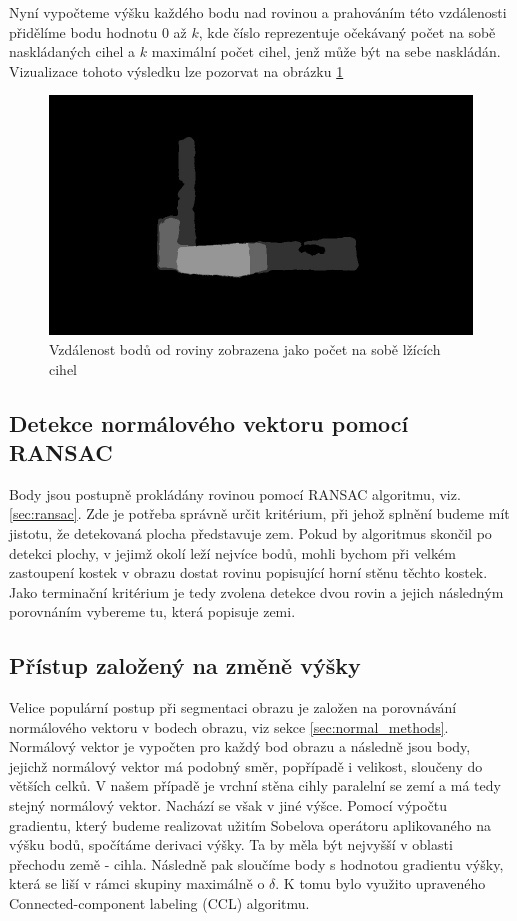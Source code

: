 \documentclass[twoside]{ctuthesis}
\begin{document}
Nyní vypočteme výšku každého bodu nad rovinou a prahováním této vzdálenosti přidělíme bodu hodnotu 0 až $k$, kde číslo reprezentuje očekávaný počet na sobě naskládaných cihel a $k$ maximální počet cihel, jenž může být na sebe naskládán. Vizualizace tohoto výsledku lze pozorvat na obrázku \ref{fig:height_map}

\begin{figure}
    \centering
    \includegraphics[width = \linewidth]{pictures/original_vrstva2_pic1.jpg}
    \caption{Vzdálenost bodů od roviny zobrazena jako počet na sobě lžících cihel}
    \label{fig:height_map}
\end{figure}

\subsection{Detekce normálového vektoru pomocí RANSAC}
\label{sec:plane_ransac}
Body jsou postupně prokládány rovinou pomocí RANSAC algoritmu, viz. \ref{sec:ransac}. Zde je potřeba správně určit kritérium, při jehož splnění budeme mít jistotu, že detekovaná plocha představuje zem. Pokud by algoritmus skončil po detekci plochy, v jejimž okolí leží nejvíce bodů, mohli bychom při velkém zastoupení kostek v obrazu dostat rovinu popisující horní stěnu těchto kostek. Jako terminační kritérium je tedy zvolena detekce dvou rovin a jejich následným porovnáním vybereme tu, která popisuje zemi.

\subsection{Přístup založený na změně výšky}
\label{sec:sobel_normal}
Velice populární postup při segmentaci obrazu je založen na porovnávání normálového vektoru v bodech obrazu, viz sekce \ref{sec:normal_methods}. Normálový vektor je vypočten pro každý bod obrazu a následně jsou body, jejichž normálový vektor má podobný směr, popřípadě i velikost, sloučeny do větších celků. V našem případě je vrchní stěna cihly paralelní se zemí a má tedy stejný normálový vektor. Nachází se však v jiné výšce. Pomocí výpočtu gradientu, který budeme realizovat užitím Sobelova operátoru aplikovaného na výšku bodů, spočítáme derivaci výšky. Ta by měla být nejvyšší v oblasti přechodu země - cihla. Následně pak sloučíme body s hodnotou gradientu výšky, která se liší v rámci skupiny maximálně o $\delta$. K tomu bylo využito upraveného Connected-component labeling (CCL) algoritmu. 
\end{document}
